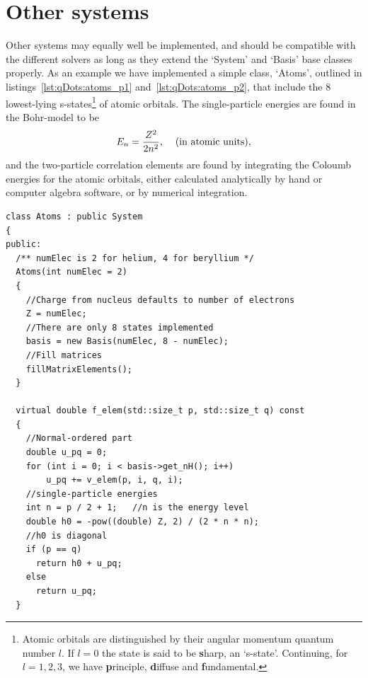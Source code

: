 \section{Other systems}
Other systems may equally well be implemented, and should be compatible with the different solvers as long as they extend the `System' and `Basis' base classes properly.
As an example we have implemented a simple class, `Atoms', outlined in listings~\ref{lst:qDots:atoms_p1} and~\ref{lst:qDots:atoms_p2}, that include the 8 lowest-lying s-states\footnote{Atomic orbitals are distinguished by their angular momentum quantum number $l$. If $l=0$ the state is said to be \textbf{s}harp, an `s-state'. Continuing, for $l=1,2,3$, we have \textbf{p}rinciple, \textbf{d}iffuse and \textbf{f}undamental.} of atomic orbitals.
The single-particle energies are found in the Bohr-model to be
\begin{equation}
E_n = \frac{Z^2}{2n^2}, \hspace{4mm}\textrm{(in atomic units)},
\end{equation}
and the two-particle correlation elements are found by integrating the Coloumb energies for the atomic orbitals, either calculated analytically by hand or computer algebra software, or by numerical integration.
\begin{lstlisting}[float,label={lst:qDots:atoms_p1},caption={Simple implementation for the first sharp atomic orbitals. Continued in listing~\ref{lst:qDots:atoms_p2}.},name={lst:qDots:atoms}]
class Atoms : public System
{
public:
  /** numElec is 2 for helium, 4 for beryllium */
  Atoms(int numElec = 2)
  {
    //Charge from nucleus defaults to number of electrons
    Z = numElec;
    //There are only 8 states implemented
    basis = new Basis(numElec, 8 - numElec);
    //Fill matrices
    fillMatrixElements();
  }

  virtual double f_elem(std::size_t p, std::size_t q) const
  {
    //Normal-ordered part
    double u_pq = 0;
    for (int i = 0; i < basis->get_nH(); i++)
        u_pq += v_elem(p, i, q, i);
	//single-particle energies
    int n = p / 2 + 1;	 //n is the energy level
	double h0 = -pow((double) Z, 2) / (2 * n * n);
	//h0 is diagonal
    if (p == q)
      return h0 + u_pq;
    else
      return u_pq;
  }
\end{lstlisting}
